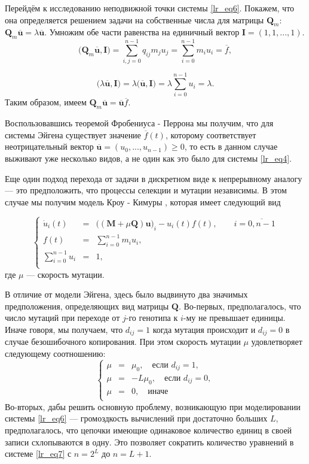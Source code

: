 Перейдём к исследованию неподвижной точки системы \eqref{lr_eq6}. Покажем, что она определяется решением задачи на собственные числа для матрицы $\mathbf{Q}_{m}$: $\mathbf{Q}_{m}\overline{\mathbf{u}} = \lambda\overline{\mathbf{u}}$. Умножим обе части равенства на единичный вектор $\mathbf{I} = (1, 1, ..., 1)$.
$$
\Bigg(\mathbf{Q}_{m}\overline{\mathbf{u}}, \mathbf{I}\Bigg) = \sum\limits_{i, j = 0}^{n - 1}q_{ij}m_{j}u_{j} = \sum\limits_{i = 0}^{n - 1}m_{i}u_{i} = \overline{f},
$$

$$
\Big(\lambda\overline{\mathbf{u}}, \mathbf{I}\Big) = \lambda\Big(\overline{\mathbf{u}}, \mathbf{I}\Big) = \lambda\sum\limits_{i = 0}^{n - 1}u_{i} = \lambda.
$$
Таким образом, имеем $\mathbf{Q}_{m}\overline{\mathbf{u}} = \overline{\mathbf{u}}\overline{f}$.

Воспользовавшись теоремой Фробениуса - Перрона мы получим, что для системы Эйгена существует значение $\overline{f}(t)$, которому соответствует неотрицательный вектор $\overline{\mathbf{u}} = (u_{0}, ..., u_{n - 1}) \ge 0$, то есть в данном случае выживают уже несколько видов, а не один как это было для системы \eqref{lr_eq4}. 

Еще один подход перехода от задачи в дискретном виде к непрерывному аналогу --- это предположить, что процессы селекции и мутации независимы. В этом случае мы получим модель Кроу - Кимуры \cite{Crow}, которая имеет следующий вид

\begin{equation}
\left\{
\begin{array}{rcl}
\dot{u}_{i}(t) & = & \Big((\mathbf{M} + \mu \mathbf{Q})\mathbf{u}\Big)_{i} - u_{i}(t)f(t), \qquad i = \overline{0, n - 1}\\
f(t) & = & \sum\limits_{i = 0}^{n - 1} m_{i}u_{i},\\
\sum\limits_{i = 0}^{n - 1} u_{i} & = & 1,\\ 
\end{array}
\right.
\label{lr_eq7}
\end{equation}
где $\mu$ --- скорость мутации. 

В отличие от модели Эйгена, здесь было выдвинуто два значимых предположения, определяющих вид матрицы $\mathbf{Q}$. Во-первых, предполагалось, что число мутаций при переходе от $j$-го генотипа к $i$-му не превышает единицы. Иначе говоря, мы получаем, что $d_{ij} = 1$ когда мутация происходит и $d_{ij} = 0$ в случае безошибочного копирования. При  этом скорость мутации $\mu$ удовлетворяет следующему соотношению:
$$
\left\{
\begin{array}{rcl}
\mu &=& \mu_{0}, \quad \text{если } d_{ij} = 1,\\
\mu &=& -L\mu_{0}, \quad \text{если } d_{ij} = 0,\\
\mu &=& 0, \quad \text{иначе}\\
\end{array}
\right.
$$  
Во-вторых, дабы решить основную проблему, возникающую при моделировании системы \eqref{lr_eq6} --- громоздкость вычислений при достаточно больших $L$,  предполагалось, что цепочки имеющие одинаковое количество единиц в своей записи схлопываются в одну. Это позволяет сократить количество уравнений в системе \eqref{lr_eq7} с $n = 2^{L}$ до $n = L + 1$.

